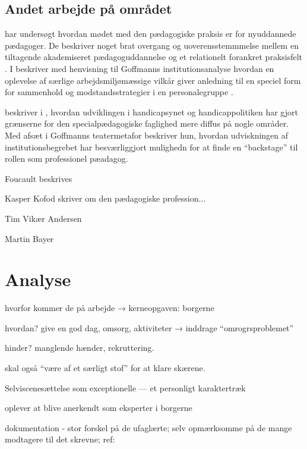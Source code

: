 \subsection{Andet arbejde på området}
\citeauthor{nielsenAttraktivPaPapiret2017} har undersøgt hvordan mødet med den pædagogiske praksis er for nyuddannede pædagoger. De beskriver noget brat overgang og uoverensstemmmelse mellem en tiltagende akademiseret pædagoguddannelse og et relationelt forankret praksisfelt \autocite{nielsenAttraktivPaPapiret2017}.
I  beskriver \citeauthor{dreyerespersenBekymrendeIdentiteterAnbragte2010} med henvisning til Goffmanns institutionsanalyse hvordan en oplevelse af særlige arbejdsmiljømæssige vilkår giver anledning til en speciel form for sammenhold og modstandsstrategier i en personalegruppe \autocite{dreyerespersenBekymrendeIdentiteterAnbragte2010}.

\citeauthor{hurFrigorelsensMagt2015} beskriver i , hvordan udviklingen i handicapsynet og handicappolitiken har gjort grænserne for den specialpædagogiske faglighed mere diffus på nogle områder.
Med afsæt i Goffmanns teatermetafor beskriver hun, hvordan udviskningen af institutionsbegrebet har besværliggjort mulighedn for at finde en “backstage” til rollen som professionel pæadagog.

Foucault beskrives


Kasper Kofod skriver om den pædagogiske profession...

Tim Vikær Andersen

Martin Bayer

\section{Analyse}
hvorfor kommer de på arbejde → kerneopgaven: borgerne

hvordan? give en god dag, omsorg, aktiviteter → inddrage “omrogrsproblemet” \autocite[s.455ff]{hansbolKonstruktionAfProfessionel2008}

hinder? manglende hænder, rekruttering.

skal også “være af et særligt stof” for at klare skærene.

Selviscenesættelse som exceptionelle --- et personligt karaktertræk

oplever at blive anerkendt som eksperter i borgerne

dokumentation - stor forskel på de ufaglærte; selv opmærksomme på de mange modtagere til det skrevne; ref: \autocite{hjerrildNarViSkriver2017, andersenUndervisningInstitutionOg2019}

